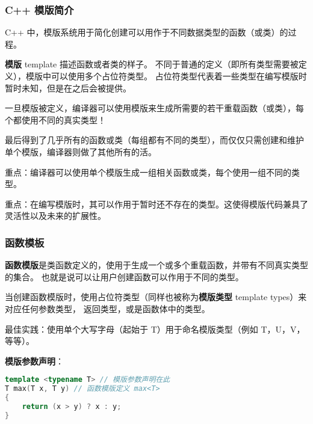 \documentclass[../../LearnCpp.tex]{subfiles}
\begin{document}

\subsubsection*{C++ 模版简介}

C++ 中，模版系统用于简化创建可以用作于不同数据类型的函数（或类）的过程。

\textbf{模版} template 描述函数或者类的样子。
不同于普通的定义（即所有类型需要被定义），模版中可以使用多个占位符类型。
占位符类型代表着一些类型在编写模版时暂时未知，但是在之后会被提供。

一旦模版被定义，编译器可以使用模版来生成所需要的若干重载函数（或类），每个都使用不同的真实类型！

最后得到了几乎所有的函数或类（每组都有不同的类型），而仅仅只需创建和维护单个模版，编译器则做了其他所有的活。

重点：编译器可以使用单个模版生成一组相关函数或类，每个使用一组不同的类型。

重点：在编写模版时，其可以作用于暂时还不存在的类型。这使得模版代码兼具了灵活性以及未来的扩展性。

\subsubsection*{函数模板}

\textbf{函数模版}是类函数定义的，使用于生成一个或多个重载函数，并带有不同真实类型的集合。
也就是说可以让用户创建函数可以作用于不同的类型。

当创建函数模版时，使用占位符类型（同样也被称为\textbf{模版类型} template types）来对应任何参数类型，
返回类型，或是函数体中的类型。

最佳实践：使用单个大写字母（起始于 T）用于命名模版类型（例如 T，U，V，等等）。

\textbf{模版参数声明}：

\begin{lstlisting}[language=C++]
template <typename T> // 模版参数声明在此
T max(T x, T y) // 函数模版定义 max<T>
{
    return (x > y) ? x : y;
}
\end{lstlisting}
\end{document}
